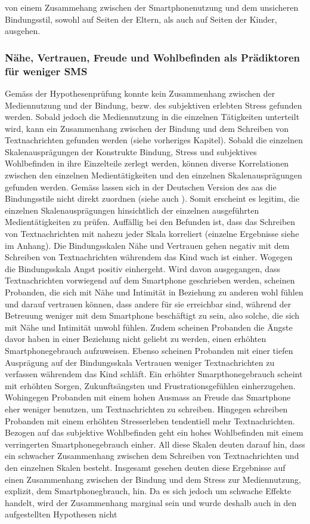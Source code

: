 von einem Zusammehang zwischen der Smartphonenutzung und dem unsicheren Bindungsstil, sowohl auf Seiten der Eltern, als auch auf Seiten der Kinder, ausgehen.

\subsubsection{Nähe, Vertrauen, Freude und Wohlbefinden als Prädiktoren für weniger SMS}
Gemäss der Hypothesenprüfung konnte kein Zusammenhang zwischen der Mediennutzung und der Bindung, bezw. des subjektiven erlebten Stress gefunden werden. Sobald jedoch die Mediennutzung in die einzelnen Tätigkeiten unterteilt wird, kann ein Zusammenhang zwischen der Bindung und dem Schreiben von Textnachrichten gefunden werden (siehe vorheriges Kapitel). Sobald die einzelnen Skalenausprägungen der Konstrukte Bindung, Stress und subjektives Wohlbefinden in ihre Einzelteile zerlegt werden, können diverse Korrelationen zwischen den einzelnen Medientätigkeiten und den einzelnen Skalenausprägungen gefunden werden. Gemäss  lassen sich in der Deutschen Version des \acrshort{aas} die Bindungsstile nicht direkt zuordnen (siehe auch \textit{}). Somit erscheint es legitim, die einzelnen Skalenausprägungen hinsichtlich der einzelnen ausgeführten Medientätigkeiten zu prüfen. Auffällig bei den Befunden ist, dass das Schreiben von Textnachrichten mit nahezu jeder Skala korreliert (einzelne Ergebnisse siehe  im Anhang). Die Bindungsskalen Nähe und Vertrauen gehen negativ mit dem Schreiben von Textnachrichten währendem das Kind wach ist einher. Wogegen die Bindungsskala Angst positiv einhergeht. Wird davon ausgegangen, dass Textnachrichten vorwiegend auf dem Smartphone geschrieben werden, scheinen Probanden, die sich mit Nähe und Intimität in Beziehung zu anderen wohl fühlen und darauf vertrauen können, dass andere für sie erreichbar sind, während der Betreuung weniger mit dem Smartphone beschäftigt zu sein, also solche, die sich mit Nähe und Intimität unwohl fühlen. Zudem scheinen Probanden die Ängste davor haben in einer Beziehung nicht geliebt zu werden, einen erhöhten Smartphonegebrauch aufzuweisen. Ebenso scheinen Probanden mit einer tiefen Ausprägung auf der Bindungsskala Vertrauen weniger Textnachrichten zu verfassen währendem das Kind schläft. Ein erhöhter Smarpthonegebrauch scheint mit erhöhten Sorgen, Zukunftsängsten und Frustrationsgefühlen einherzugehen. Wohingegen Probanden mit einem hohen Ausmass an Freude das Smartphone eher weniger benutzen, um Textnachrichten zu schreiben. Hingegen schreiben Probanden mit einem erhöhten Stresserleben tendentiell mehr Textnachrichten. Bezogen auf das subjektive Wohlbefinden geht ein hohes Wohlbefinden mit einem verringerten Smartphonegebrauch einher. All diese Skalen deuten darauf hin, dass ein schwacher Zusammenhang zwischen dem Schreiben von Textnachrichten und den einzelnen Skalen besteht. Insgesamt gesehen deuten diese Ergebnisse auf einen Zusammenhang zwischen der Bindung und dem Stress zur Mediennutzung, explizit, dem Smartphonegbrauch, hin. Da es sich jedoch um schwache Effekte handelt, wird der Zusammenhang marginal sein und wurde deshalb auch in den aufgestellten Hypothesen nicht 